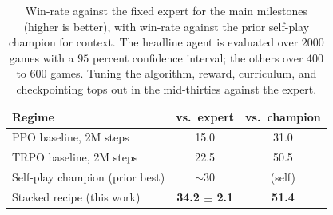 \documentclass[letterpaper]{article} %
\begin{document}
\begin{table}[t]
\centering
\small
\caption{Win-rate against the fixed expert for the main milestones (higher is
better), with win-rate against the prior self-play champion for context. The
headline agent is evaluated over $2000$ games with a $95$ percent confidence
interval; the others over $400$ to $600$ games. Tuning the algorithm, reward,
curriculum, and checkpointing tops out in the mid-thirties against the expert.}
\label{tab:numbers}
\begin{tabular}{@{}lcc@{}}
\toprule
\textbf{Regime} & \textbf{vs.\ expert} & \textbf{vs.\ champion} \\
\midrule
PPO baseline, 2M steps          & 15.0 & 31.0 \\
TRPO baseline, 2M steps         & 22.5 & 50.5 \\
Self-play champion (prior best) & $\sim$30 & (self) \\
Stacked recipe (this work)      & \textbf{34.2 $\pm$ 2.1} & \textbf{51.4} \\
\bottomrule
\end{tabular}
\end{table}
\end{document}
